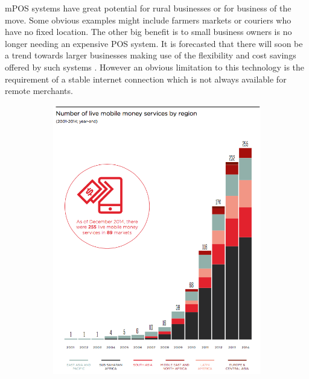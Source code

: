 \documentclass[paper=a4, fontsize=12pt]{scrartcl}	%
\numberwithin{equation}{section}															%
\numberwithin{figure}{section}																%
\numberwithin{table}{section}
\begin{document}
mPOS systems have great potential for rural businesses or for business of the move. Some obvious examples might include farmers markets or couriers who have no fixed location. The other big benefit is to small business owners is no longer needing an expensive POS system. It is forecasted that there will soon be a trend towards larger businesses making use of the flexibility and cost savings offered by such systems \cite{4512015research}. However an obvious limitation to this technology is the requirement of a stable internet connection which is not always available for remote merchants.

\begin{figure}[H]
    \centering
    
    \begin{subfigure}[b]{0.7\textwidth}
        \includegraphics[width=\textwidth]{img/moneyservices.png}
    \end{subfigure}
    

\end{figure}
\end{document}
